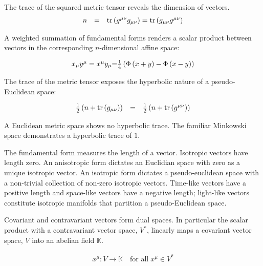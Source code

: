 \documentclass[aps,twocolumn,secnumarabic,nobalancelastpage,amsmath,amssymb,
amsthm,nofootinbib,parskip=full]{revtex4}
\numberwithin{equation}{section}
\newcommand{\pa}[1]{\left(#1\right)}
\begin{document}
The trace of the squared metric tensor reveals the dimension of vectors.
\begin{equation*}
\begin{array}{rcl}
n&=&\tr\pa{g^{\mu\nu}g_{\mu\nu}}=\tr\pa{g_{\mu\nu}g^{\mu\nu}}
\end{array}
\end{equation*}

A weighted summation of fundamental forms renders a
scalar product between vectors in the
corresponding $n$-dimensional affine space:

\begin{equation*}
\begin{array}{rcl}
x_\mu y^\mu = x^\mu y_\mu $=$ \frac{1}{4}\pa{\Phi\pa{x+y}-\Phi\pa{x-y}}
\end{array}
\end{equation*}

The trace of the metric tensor exposes the hyperbolic nature of a
pseudo-Euclidean space:

\begin{equation*}
\begin{array}{rcl}
\frac{1}{2}\pa{n+\tr\pa{g_{\mu\nu}}}&=&\frac{1}{2}\pa{n+\tr\pa{g^{\mu\nu}}}
\end{array}
\end{equation*}

A Euclidean metric space shows no hyperbolic trace.
The familiar Minkowski space demonstrates a hyperbolic trace of $1$.

The fundamental form measures the
length of a vector. Isotropic vectors have length zero.
An anisotropic form dictates an Euclidian space with
zero as a unique isotropic vector.
An isotropic form dictates a pseudo-euclidean space with a non-trivial
collection of non-zero isotropic vectors.
Time-like vectors have a positive length and space-like vectors have a
negative length; light-like vectors constitute isotropic manifolds
that partition a pseudo-Euclidean space. 

Covariant and contravariant vectors form dual spaces. In particular the
scalar product with a contravariant vector space, $V^*$, linearly maps
a covariant vector space, $V$ into an abelian field $\mathbb{K}$. 

\begin{equation*}
\begin{array}{rcl}
x^\mu:V\rightarrow\mathbb{K}\quad\text{for all}\;x^\mu\in V^*
\end{array}
\end{equation*}
\end{document}
